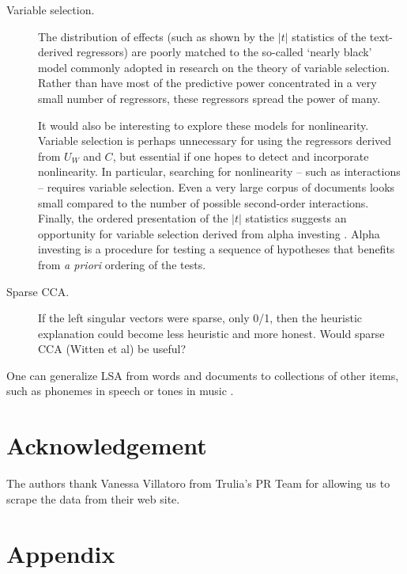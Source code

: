 \documentclass[12pt]{article}
\begin{document}
\begin{description}
   \item[Variable selection.]  The distribution of effects (such as shown by the $|t|$ statistics of the text-derived regressors) are poorly matched to the so-called `nearly black' model commonly adopted in research on the theory of variable selection.  Rather than have most of the predictive power concentrated in a very small number of regressors, these regressors spread the power of many.  
      
   It would also be interesting to explore these models for nonlinearity. Variable selection is perhaps unnecessary for using the regressors derived from $U_W$ and $C$, but essential if one hopes to detect and incorporate nonlinearity. In particular, searching for nonlinearity -- such as interactions -- requires variable selection.  Even a very large corpus of documents looks small compared to the number of possible second-order interactions.  Finally, the ordered presentation of the $|t|$ statistics suggests an opportunity for variable selection derived from alpha investing \citep{fosterstine08}.  Alpha investing is a procedure for testing a sequence of hypotheses that benefits from {\it a priori} ordering of the tests.
   
      \item[Sparse CCA.] If the left singular vectors were sparse, only 0/1, then the heuristic explanation could become less heuristic and more honest.  Would sparse CCA (Witten et al) be useful? \citet{witten09}


   \end{description}

One can generalize LSA from words and documents to collections of other items,
 such as phonemes in speech or tones in music \cite[called latent semantic
 mapping in][]{bellegarda05}.



\section*{Acknowledgement}

The authors thank Vanessa Villatoro from Trulia's PR Team for allowing us to scrape the data from their web site.

\section*{Appendix}
\end{document}
